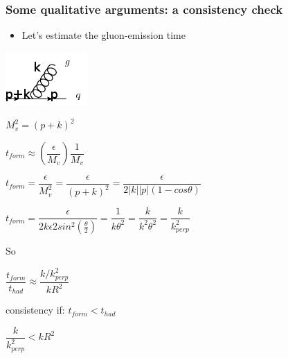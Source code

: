 \documentclass[9pt, xcolor=dvipsnames]{beamer}
\begin{document}
\begin{frame}
\frametitle{Some qualitative arguments: a consistency check}
\begin{itemize}
 \item Let's estimate the gluon-emission time
\end{itemize}

\medskip
\begin{block}{}
\begin{minipage}{.25\columnwidth}
\begin{center}
 \includegraphics[scale=0.3]{emission}
\end{center}
\end{minipage}
\begin{minipage}{.7\columnwidth}
$M^{2}_{v}=(p+k)^{2}$

\pause
\medskip
$t_{form}\approx(\dfrac{\epsilon}{M_{v}})\dfrac{1}{M_{v}}$

\pause
\medskip
$t_{form}=\dfrac{\epsilon}{M^{2}_{v}}=\dfrac{\epsilon}{(p+k)^{2}}=\dfrac{\epsilon}{2|k||p|(1-cos\theta)}$

\pause
\medskip
$t_{form}=\dfrac{\epsilon}{2k\epsilon2sin^{2}(\frac{\theta}{2})}=\dfrac{1}{k\theta^{2}}=\dfrac{k}{k^{2}\theta^{2}}=\dfrac{k}{k^{2}_{perp}}$
\end{minipage}
\end{block}
\pause
So
\begin{center}
 $\dfrac{t_{form}}{t_{had}}\approx\dfrac{k/k^{2}_{perp}}{kR^{2}}$
\end{center}

\pause
\begin{block}{}
consistency if: \textbf{$t_{form}<t_{had}$}
\end{block}
\begin{center}
$\dfrac{k}{k^{2}_{perp}}<kR^{2}$

\medskip
{}
\end{center}
\end{frame}
\end{document}
